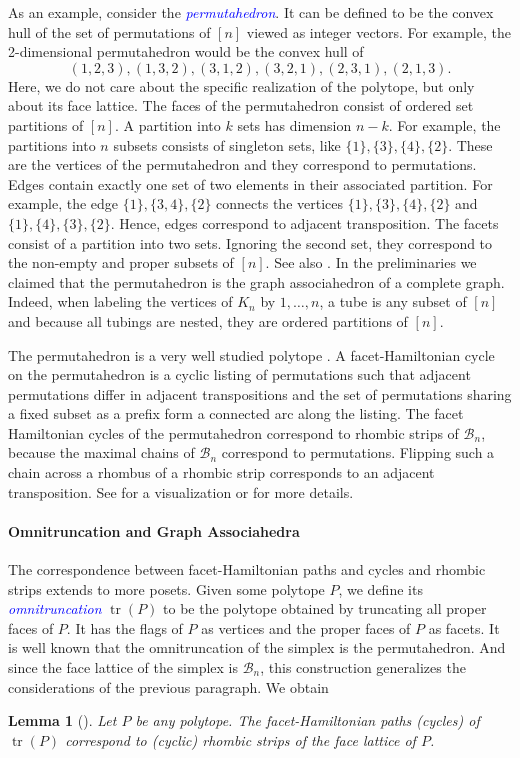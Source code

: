 \documentclass[fontsize=11pt,a4paper,DIV=12]{scrartcl}
\newcommand{\defn}[1]{\textsl{\textcolor{Blue}{#1}}}
\newtheorem{lemma}[theorem]{Lemma}
\DeclareMathOperator{\tr}{tr}
\begin{document}
As an example, consider the \defn{permutahedron}. It can be defined to be the convex hull of the set of permutations of $[n]$ viewed as integer vectors. For example, the 2-dimensional permutahedron would be the convex hull of
\[
    (1,2,3),(1,3,2),(3,1,2),(3,2,1),(2,3,1),(2,1,3).
\]
Here, we do not care about the specific realization of the polytope, but only about its face lattice. The faces of the permutahedron consist of ordered set partitions of $[n]$. A partition into $k$ sets has dimension $n-k$. For example, the partitions into $n$ subsets consists of singleton sets, like $\{1\},\{3\},\{4\},\{2\}$. These are the vertices of the permutahedron and they correspond to permutations. Edges contain exactly one set of two elements in their associated partition. For example, the edge $\{1\},\{3,4\},\{2\}$ connects the vertices $\{1\},\{3\},\{4\},\{2\}$ and $\{1\},\{4\},\{3\},\{2\}$. Hence, edges correspond to adjacent transposition. The facets consist of a partition into two sets. Ignoring the second set, they correspond to the non-empty and proper subsets of $[n]$. See also . In the preliminaries we claimed that the permutahedron is the graph associahedron of a complete graph. Indeed, when labeling the vertices of $K_n$ by $1,\ldots,n$, a tube is any subset of $[n]$ and because all tubings are nested, they are ordered partitions of $[n]$.

The permutahedron is a very well studied polytope \cite{Permutahedra_associahedra_beyond, Permutahedron_and_gen_associahedron}. A facet-Hamiltonian cycle on the permutahedron is a cyclic listing of permutations such that adjacent permutations differ in adjacent transpositions and the set of permutations sharing a fixed subset as a prefix form a connected arc along the listing. The facet Hamiltonian cycles of the permutahedron correspond to rhombic strips of $\mathcal B_n$, because the maximal chains of $\mathcal B_n$ correspond to permutations. Flipping such a chain across a rhombus of a rhombic strip corresponds to an adjacent transposition. See   for a visualization or \cite{facethamiltonicity} for more details.

\paragraph{Omnitruncation and Graph Associahedra}
The correspondence between facet-Hamiltonian paths and cycles and rhombic strips extends to more posets. Given some polytope $P$, we define its \defn{omnitruncation} $\tr(P)$ to be the polytope obtained by truncating all proper faces of $P$. It has the flags of $P$ as vertices and the proper faces of $P$ as facets. It is well known that the omnitruncation of the simplex is the permutahedron. And since the face lattice of the simplex is $\mathcal B_n$, this construction generalizes the considerations of the previous paragraph. We obtain
\begin{lemma}[\cite{facethamiltonicity}]
    Let $P$ be any polytope. The facet-Hamiltonian paths (cycles) of $\tr(P)$ correspond to (cyclic) rhombic strips of the face lattice of $P$.
\end{lemma}
\end{document}
